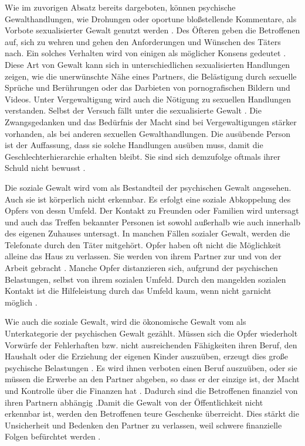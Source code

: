 Wie im zuvorigen Absatz bereits dargeboten, können psychische Gewalthandlungen, wie Drohungen oder oportune bloßstellende Kommentare, als Vorbote sexualisierter Gewalt genutzt werden \parencite{Übergang_psy_zu_sex_Gewalt}. Des Öfteren geben die Betroffenen auf, sich zu wehren und gehen den Anforderungen und Wünschen des Täters nach. Ein solches Verhalten wird von einigen als möglicher Konsens gedeutet \parencite{Def_haus_Gewalt_2}. Diese Art von Gewalt kann sich in unterschiedlichen sexualisierten Handlungen zeigen, wie die unerwünschte Nähe eines Partners, die Belästigung durch sexuelle Sprüche und Berührungen oder das Darbieten von pornografischen Bildern und Videos. Unter Vergewaltigung wird auch die Nötigung zu sexuellen Handlungen verstanden. Selbst der Versuch fällt unter die sexualisierte Gewalt \parencite{Def_haus_Gewalt_2, Gewaltart, Def_Form_Folge_Gewalt}. Die Zwangsgedanken und das Bedürfnis der Macht sind bei Vergewaltigungen stärker vorhanden, als bei anderen sexuellen Gewalthandlungen. Die ausübende Person ist der Auffassung, dass sie solche Handlungen ausüben muss, damit die Geschlechterhierarchie erhalten bleibt. Sie sind sich demzufolge oftmals ihrer Schuld nicht bewusst \parencite{Def_haus_Gewalt_2}.

Die soziale Gewalt wird vom \textcite{Def_Form_Folge_Gewalt} als Bestandteil der psychischen Gewalt angesehen. Auch sie ist körperlich nicht erkennbar. Es erfolgt eine soziale Abkoppelung des Opfers von dessn Umfeld. Der Kontakt zu Freunden oder Familien wird untersagt und auch das Treffen bekannter Personen ist sowohl außerhalb wie auch innerhalb des eigenen Zuhauses untersagt. In manchen Fällen sozialer Gewalt, werden die Telefonate durch den Täter mitgehört. Opfer haben oft nicht die Möglichkeit alleine das Haus zu verlassen. Sie werden von ihrem Partner zur und von der Arbeit gebracht \parencite{Def_haus_Gewalt_2, Def_Form_Folge_Gewalt}. Manche Opfer distanzieren sich, aufgrund der psychischen Belastungen, selbst von ihrem sozialen Umfeld. Durch den mangelden sozialen Kontakt ist die Hilfeleistung durch das Umfeld kaum, wenn nicht garnicht möglich \parencite{Def_haus_Gewalt_2}.

Wie auch die soziale Gewalt, wird die ökonomische Gewalt vom \textcite{Def_Form_Folge_Gewalt} als Unterkategorie der psychischen Gewalt gezählt. Müssen sich die Opfer wiederholt Vorwürfe der Fehlerhaften bzw. nicht ausreichenden Fähigkeiten ihren Beruf, den Haushalt oder die Erziehung der eigenen Kinder auszuüben, erzeugt dies große psychische Belastungen \parencite{Def_haus_Gewalt_2}. Es wird ihnen verboten einen Beruf auszuüben, oder sie müssen die Erwerbe an den Partner abgeben, so dass er der einzige ist, der Macht und Kontrolle über die Finanzen hat \parencite{Def_haus_Gewalt_2, Def_Form_Folge_Gewalt}. Dadurch sind die Betroffenen finanziel von ihren Partnern abhängig \parencite{physische_Gewalt_wie_aggro}.Damit die Gewalt von der Öffentlichkeit nicht erkennbar ist, werden den Betroffenen teure Geschenke überreicht. Dies stärkt die Unsicherheit und Bedenken den Partner zu verlassen, weil schwere finanzielle Folgen befürchtet werden \parencite{Übergang_psy_zu_sex_Gewalt}.

